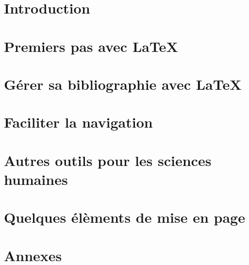 \frontmatter
\part{Introduction}



\mainmatter

\part{Premiers pas avec \LaTeX}









\part{Gérer sa bibliographie avec \LaTeX}\label{bibliographie}








\part{Faciliter la navigation}




\part{Autres outils pour les sciences humaines}





\part{Quelques élèments de mise en page}





\appendix
\part{Annexes}











\setcounter{tocdepth}{2}
\tableofcontents
